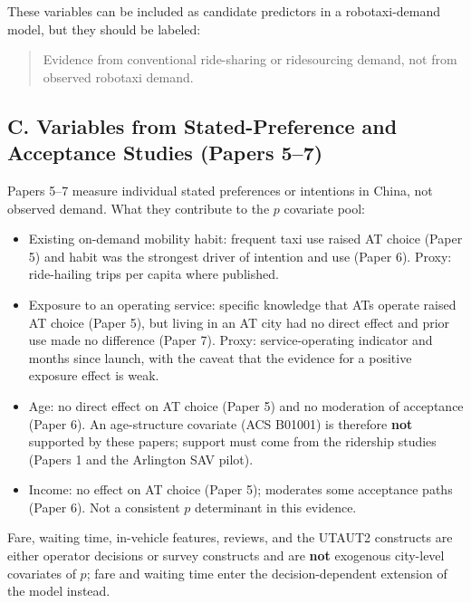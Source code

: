 \documentclass[10pt,a4paper]{article}
\providecommand{\tightlist}{\setlength{\itemsep}{0pt}\setlength{\parskip}{0pt}}
\begin{document}
These variables can be included as candidate predictors in a robotaxi-demand model, but they should be labeled:

\begin{quote}
Evidence from conventional ride-sharing or ridesourcing demand, not from observed robotaxi demand.
\end{quote}


\hypertarget{c.-variables-from-stated-preference-and-acceptance-studies}{%
\subsection{C. Variables from Stated-Preference and Acceptance Studies (Papers 5--7)}\label{c.-variables-from-stated-preference-and-acceptance-studies}}

Papers 5--7 measure individual stated preferences or intentions in China, not observed demand. What they contribute to the $p$ covariate pool:

\begin{itemize}
\tightlist
\item
  Existing on-demand mobility habit: frequent taxi use raised AT choice (Paper 5) and habit was the strongest driver of intention and use (Paper 6). Proxy: ride-hailing trips per capita where published.
\item
  Exposure to an operating service: specific knowledge that ATs operate raised AT choice (Paper 5), but living in an AT city had no direct effect and prior use made no difference (Paper 7). Proxy: service-operating indicator and months since launch, with the caveat that the evidence for a positive exposure effect is weak.
\item
  Age: no direct effect on AT choice (Paper 5) and no moderation of acceptance (Paper 6). An age-structure covariate (ACS B01001) is therefore \textbf{not} supported by these papers; support must come from the ridership studies (Papers 1 and the Arlington SAV pilot).
\item
  Income: no effect on AT choice (Paper 5); moderates some acceptance paths (Paper 6). Not a consistent $p$ determinant in this evidence.
\end{itemize}

Fare, waiting time, in-vehicle features, reviews, and the UTAUT2 constructs are either operator decisions or survey constructs and are \textbf{not} exogenous city-level covariates of $p$; fare and waiting time enter the decision-dependent extension of the model instead.
\end{document}

